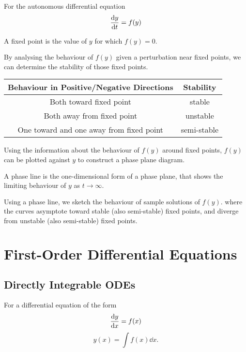 \documentclass{article}
\begin{document}
For the autonomous differential equation
\begin{equation*}
    \dv{y}{t} = f(y)
\end{equation*}
\begin{definition}
    A fixed point is the value of $y$ for which $f(y) = 0$.
\end{definition}
\begin{definition}[Stability]
    By analysing the behaviour of $f(y)$ given a perturbation near fixed points, 
    we can determine the stability of those fixed points.
    \begin{table}[H]
        \centering
        \begin{tabular}{c | c}
            \toprule
            \textbf{Behaviour in Positive/Negative Directions} & \textbf{Stability} \\
            \midrule
            Both toward fixed point & stable \\
            Both away from fixed point & unstable \\
            One toward and one away from fixed point & semi-stable \\
            \bottomrule
        \end{tabular}
    \end{table}
\end{definition}
\begin{definition}
    Using the information about the behaviour of $f(y)$ around fixed points, $f(y)$ can be plotted against $y$
    to construct a phase plane diagram.
\end{definition}
\begin{definition}
    A phase line is the one-dimensional form of a phase plane,
    that shows the limiting behaviour of $y$ as $t \to \infty$.
\end{definition}
\begin{definition}
    Using a phase line, we sketch the behaviour of sample solutions of $f(y)$.
    where the curves asymptote toward stable
    (also semi-stable) fixed points, and diverge from unstable (also semi-stable) fixed points.
\end{definition}
\newpage
\section{First-Order Differential Equations}
\subsection{Directly Integrable ODEs}
For a differential equation of the form
\begin{equation*}
    \dv{y}{x} = f(x)
\end{equation*}
\begin{equation*}
    y(x) = \int f(x) \dd{x}.
\end{equation*}
\end{document}
